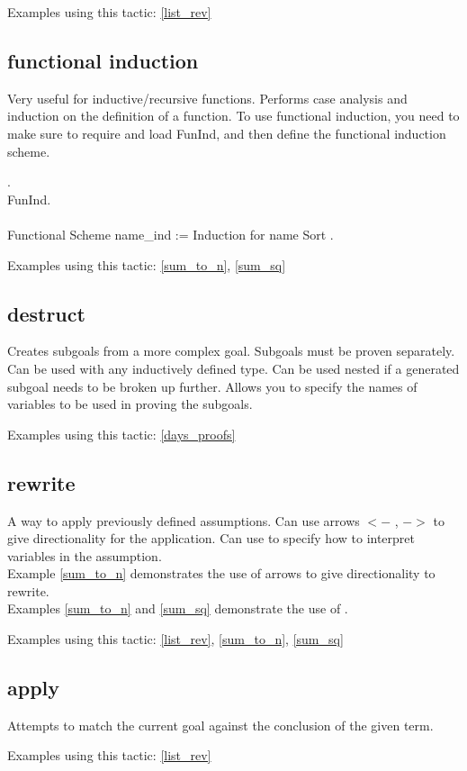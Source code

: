 \noindent
Examples using this tactic: 
\ref{list_rev}




\subsection{functional induction} \label{functional induction}
Very useful for inductive/recursive functions.
Performs case analysis and induction on the definition of a function.
To use functional induction, you need to make sure to require and load FunInd, and then define the functional induction scheme.

\begin{code}
 .	\\
\Load FunInd.
\\ \\
Functional Scheme name\_ind := Induction for name Sort .
\end{code}

\noindent
Examples using this tactic: 
\ref{sum_to_n}, \ref{sum_sq}




\subsection{destruct} \label{destruct}
Creates subgoals from a more complex goal. 
Subgoals must be proven separately.
Can be used with any inductively defined type.
Can be used nested if a generated subgoal needs to be broken up further.
Allows you to specify the names of variables to be used in proving the subgoals.

\noindent
Examples using this tactic: 
\ref{days_proofs}




\subsection{rewrite} \label{rewrite}
A way to apply previously defined assumptions.
Can use arrows $<-$ , $->$ to give directionality for the application. 
Can use  to specify how to interpret variables in the assumption.
~\\ \noindent
Example \ref{sum_to_n} demonstrates the use of arrows to give directionality to rewrite.  
~\\ \noindent
Examples \ref{sum_to_n} and \ref{sum_sq} demonstrate the use of . 

\noindent
Examples using this tactic: 
\ref{list_rev}, \ref{sum_to_n}, \ref{sum_sq}




\subsection{apply} \label{apply}
Attempts to match the current goal against the conclusion of the given term.

\noindent
Examples using this tactic:
\ref{list_rev}






